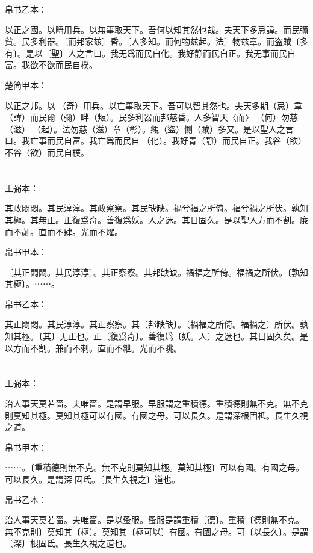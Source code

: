 \documentclass[a5paper]{ctexbook}
\begin{document}
    帛书乙本：

    以正之國。以畸用兵。以無事取天下。吾何以知其然也哉。夫天下多忌諱。而民彌貧。民多利器。〔而邦家兹〕昏。〔人多知。而何物兹起。法〕物兹章。而盗賊〔多有〕。是以〔聖〕人之言曰。我无爲而民自化。我好静而民自正。我无事而民自富。我欲不欲而民自樸。

    楚简甲本：

    以正之邦。以󶵊（奇）用兵。以亡事取天下。吾可以智其然也。夫天多期（忌）韋（諱）而民爾（彌）畔（叛）。民多利器而邦慈昏。人多智天〈而〉𢦪（何）勿慈（滋）󶵋（起）。法勿慈（滋）章（彰）。覜（盜）惻（賊）多又。是以聖人之言曰。我亡事而民自富。我亡爲而民自󶵍（化）。我好青（靜）而民自正。我谷（欲）不谷（欲）而民自樸。

    \chapter{}
    王弼本：

    其政悶悶。其民淳淳。其政察察。其民缺缺。禍兮福之所倚。福兮禍之所伏。孰知其極。其無正。正復爲奇。善復爲妖。人之迷。其日固久。是以聖人方而不割。廉而不劌。直而不肆。光而不燿。

    
    帛书甲本：

    〔其正悶悶。其民淳淳〕。其正察察。其邦缺缺。禍福之所倚。福禍之所伏。〔孰知其極〕。⋯⋯。

    帛书乙本：

    其正悶悶。其民淳淳。其正察察。其〔邦缺缺〕。〔禍福之所倚。福禍之〕所伏。孰知其極。〔其〕无正也。正〔復爲奇〕。善復爲〔妖。人〕之迷也。其日固久矣。是以方而不割。兼而不刺。直而不紲。光而不眺。

    \chapter{}
    王弼本：

    治人事天莫若嗇。夫唯嗇。是謂早服。早服謂之重積德。重積德則無不克。無不克則莫知其極。莫知其極可以有國。有國之母。可以長久。是謂深根固柢。長生久視之道。

    
    帛书甲本：

    ⋯⋯。〔重積德則無不克。無不克則莫知其極。莫知其極〕可以有國。有國之母。可以長久。是謂深󱁆固氐。〔長生久視之〕道也。

    帛书乙本：

    治人事天莫若嗇。夫唯嗇。是以蚤服。蚤服是謂重積〔德〕。重積〔德則無不克。無不克則〕莫知其〔極〕。莫知其〔極可以〕有國。有國之母。可〔以長久〕。是謂〔深〕根固氐。長生久視之道也。
\end{document}
